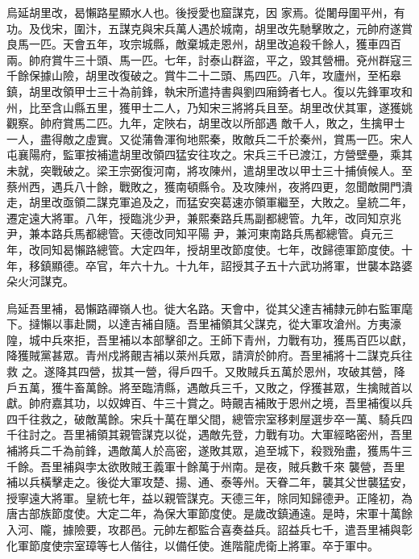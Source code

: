 \begin{pinyinscope}
 烏延胡里改，曷懶路星顯水人也。後授愛也窟謀克，因
 家焉。從闍母圍平州，有功。及伐宋，圍汴，五謀克與宋兵萬人遇於城南，胡里改先馳擊敗之，元帥府遂賞良馬一匹。天會五年，攻宗城縣，敵棄城走恩州，胡里改追殺千餘人，獲車四百兩。帥府賞牛三十頭、馬一匹。七年，討泰山群盜，平之，毀其營柵。兗州群寇三千餘保據山險，胡里改復破之。賞牛二十二頭、馬四匹。八年，攻廬州，至柘皋鎮，胡里改領甲士三十為前鋒，執宋所遣持書與劉四廂錡者七人。復以先鋒軍攻和州，比至含山縣五里，獲甲士二人，乃知宋三將將兵且至。胡里改伏其軍，遂獲姚觀察。帥府賞馬二匹。九年，定陜右，胡里改以所部遇
 敵千人，敗之，生擒甲士一人，盡得敵之虛實。又從蒲魯渾徇地熙秦，敗敵兵二千於秦州，賞馬一匹。宋人屯襄陽府，監軍按補遣胡里改領四猛安往攻之。宋兵三千已渡江，方營壁壘，乘其未就，突戰破之。梁王宗弼復河南，將攻陳州，遣胡里改以甲士三十捕偵候人。至蔡州西，遇兵八十餘，戰敗之，獲南頓縣令。及攻陳州，夜將四更，忽聞敵開門潰走，胡里改亟領二謀克軍追及之，而猛安突葛速亦領軍繼至，大敗之。皇統二年，遷定遠大將軍。八年，授臨洮少尹，兼熙秦路兵馬副都總管。九年，改同知京兆尹，兼本路兵馬都總管。天德改同知平陽
 尹，兼河東南路兵馬都總管。貞元三年，改同知曷懶路總管。大定四年，授胡里改節度使。七年，改歸德軍節度使。十年，移鎮顯德。卒官，年六十九。十九年，詔授其子五十六武功將軍，世襲本路婆朵火河謀克。



 烏延吾里補，曷懶路禪嶺人也。徙大名路。天會中，從其父達吉補隸元帥右監軍麾下。撻懶以事赴闕，以達吉補自隨。吾里補領其父謀克，從大軍攻滄州。方夷濠隍，城中兵來拒，吾里補以本部擊卻之。王師下青州，力戰有功，獲馬百匹以獻，降獲賊黨甚眾。青州戍將覿吉補以萊州兵眾，請濟於帥府。吾里補將十二謀克兵往救
 之。遂降其四營，拔其一營，得戶四千。又敗賊兵五萬於恩州，攻破其營，降戶五萬，獲牛畜萬餘。將至臨清縣，遇敵兵三千，又敗之，俘獲甚眾，生擒賊首以獻。帥府嘉其功，以奴婢百、牛三十賞之。時覿吉補敗于恩州之境，吾里補復以兵四千往救之，破敵萬餘。宋兵十萬在單父間，總管宗室移剌屋選步卒一萬、騎兵四千往討之。吾里補領其親管謀克以從，遇敵先登，力戰有功。大軍經略密州，吾里補將兵二千為前鋒，遇敵萬人於高密，遂敗其眾，追至城下，殺戮殆盡，獲馬牛三千餘。吾里補與孛太欲敗賊王義軍十餘萬于州南。是夜，賊兵數千來
 襲營，吾里補以兵橫擊走之。後從大軍攻楚、揚、通、泰等州。天眷二年，襲其父世襲猛安，授寧遠大將軍。皇統七年，益以親管謀克。天德三年，除同知歸德尹。正隆初，為唐古部族節度使。大定二年，為保大軍節度使。是歲改鎮通遠。是時，宋軍十萬餘入河、隴，據險要，攻郡邑。元帥左都監合喜奏益兵。詔益兵七千，遣吾里補與彰化軍節度使宗室璋等七人偕往，以備任使。進階龍虎衛上將軍。卒于軍中。




\end{pinyinscope}
